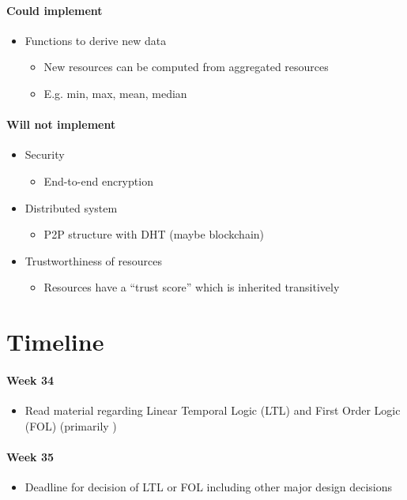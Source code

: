 \paragraph{Could implement}
\begin{itemize}
    \item Functions to derive new data
    \begin{itemize}
        \item New resources can be computed from aggregated resources
        \item E.g. min, max, mean, median
    \end{itemize}
\end{itemize}

\paragraph{Will not implement}
\begin{itemize}
    \item Security
    \begin{itemize}
        \item End-to-end encryption
    \end{itemize}
    \item Distributed system
    \begin{itemize}
        \item P2P structure with DHT (maybe blockchain)
    \end{itemize}
    \item Trustworthiness of resources
    \begin{itemize}
        \item Resources have a “trust score” which is inherited transitively
    \end{itemize}
\end{itemize}


\section{Timeline}
\paragraph{Week 34}
\begin{itemize}
    \item Read material regarding Linear Temporal Logic (LTL) and First Order Logic (FOL) (primarily \cite{baier2008principles})
\end{itemize}
\paragraph{Week 35}
\begin{itemize}
    \item Deadline for decision of LTL or FOL including other major design decisions
\end{itemize}
